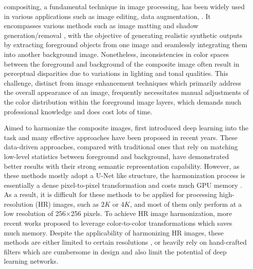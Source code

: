 \documentclass[10pt,journal,twocolumn,twoside]{IEEEtran}
\begin{document}
 compositing, a fundamental technique in image processing, has been widely used in various applications such as image editing\cite{10.1145/1201775.882269, barnes2009patchmatch, kwatra2003graphcut}, data augmentation\cite{yun2019cutmix, zhang2020learning, wang2020constrained}, \etc. It encompasses various methods such as image matting \cite{wang2023composited} and shadow generation/removal \cite{inoue2020learning}, with the objective of generating realistic synthetic outputs by extracting foreground objects from one image and seamlessly integrating them into another background image. Nonetheless, inconsistencies in color spaces between the foreground and background of the composite image often result in perceptual disparities due to variations in lighting and tonal qualities. This challenge, distinct from image enhancement techniques \cite{ren2018lecarm, zhao2021retinexdip} which primarily address the overall appearance of an image, frequently necessitates manual adjustments of the color distribution within the foreground image layers, which demands much professional knowledge and does cost lots of time.

Aimed to harmonize the composite images, \cite{tsai2017deep} first introduced deep learning into the task and many effective approaches have been proposed \cite{cong2020dovenet, guo2021image, ling2021region, guo2021intrinsic, sofiiuk2021foreground, hang2022scs} in recent years. These data-driven approaches, compared with traditional ones \cite{lalonde2007using, xue2012understanding, reinhard2001color, pitie2005n} that rely on matching low-level statistics between foreground and background, have demonstrated better results with their strong semantic representation capability. However, as these methods mostly adopt a U-Net \cite{ronneberger2015u} like structure, the harmonization process is essentially a dense pixel-to-pixel transformation and costs much GPU memory \cite{cong2022high}. As a result, it is difficult for these methods to be applied for processing high-resolution (HR) images, such as $2K$ or $4K$, and most of them only perform at a low resolution of 256$\times$256 pixels. To achieve HR image harmonization, more recent works \cite{cong2022high, ke2022harmonizer, xue2022dccf} proposed to leverage color-to-color transformations which saves much memory. Despite the applicability of harmonizing HR images, these methods are either limited to certain resolutions \cite{cong2022high}, or heavily rely on hand-crafted filters \cite{ke2022harmonizer, xue2022dccf} which are cumbersome in design and also limit the potential of deep learning networks.
\end{document}
